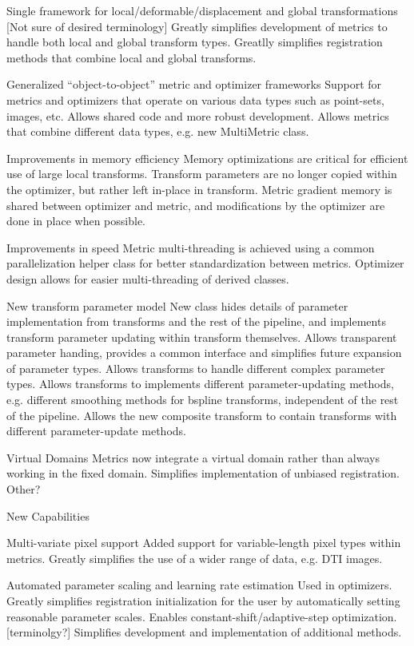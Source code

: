 \documentclass{frontiersSCNS}
\begin{document}
Single framework for local/deformable/displacement and global transformations [Not sure of desired terminology]
Greatly simplifies development of metrics to handle both local and global transform types.
Greatlly simplifies registration methods that combine local and global transforms.

Generalized “object-to-object” metric and optimizer frameworks
Support for metrics and optimizers that operate on various data types such as point-sets, images, etc.
Allows shared code and more robust development.
Allows metrics that combine different data types, e.g. new MultiMetric class.

Improvements in memory efficiency
Memory optimizations are critical for efficient use of large local transforms.
Transform parameters are no longer copied within the optimizer, but rather left in-place in transform. 
Metric gradient memory is shared between optimizer and metric, and modifications by the optimizer  are done in place when possible.

Improvements in speed
Metric multi-threading is achieved using a common parallelization helper class for better standardization between metrics.
Optimizer design allows for easier multi-threading of derived classes.

New transform parameter model
New class hides details of parameter implementation from transforms and the rest of the pipeline, and implements transform parameter updating within transform themselves.
Allows transparent parameter handing, provides a common interface and simplifies future expansion of parameter types.
Allows transforms to handle different complex parameter types.
Allows transforms to implements different parameter-updating methods, e.g. different smoothing methods for bspline transforms, independent of the rest of the pipeline.
Allows the new composite transform to contain transforms with different parameter-update methods.

Virtual Domains
Metrics now integrate a virtual domain rather than always working in the fixed domain.
Simplifies implementation of unbiased registration.
Other?

New Capabilities

Multi-variate pixel support
Added support for variable-length pixel types within metrics.
Greatly simplifies the use of a wider range of data, e.g. DTI images.

Automated parameter scaling and learning rate estimation
Used in optimizers.
Greatly simplifies registration initialization for the user by automatically setting reasonable parameter scales.
Enables constant-shift/adaptive-step optimization. [terminolgy?]
Simplifies development and implementation of additional methods.
\end{document}
